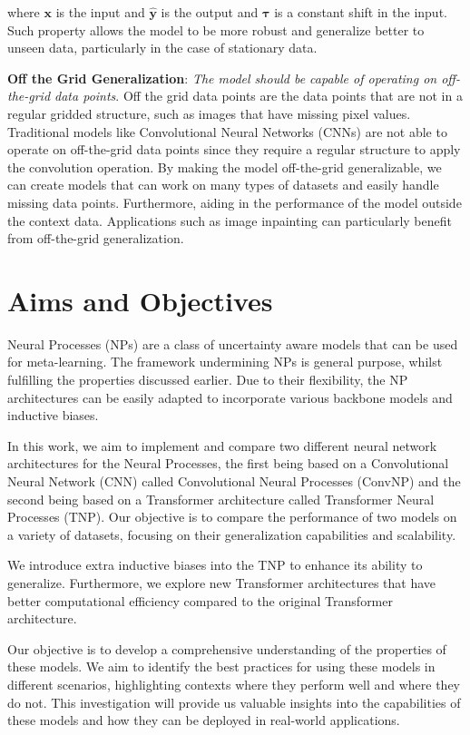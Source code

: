 \documentclass[../../main.tex]{subfiles}
\begin{document}
where $\bm{x}$ is the input and $\bm{\hat{y}}$ is the output and $\bm{\tau}$ is a constant shift in the input. Such property allows the model to be more robust and generalize better to unseen data, particularly in the case of stationary data.


\textbf{Off the Grid Generalization}: \emph{The model should be capable of operating on off-the-grid data points}. Off the grid data points are the data points that are not in a regular gridded structure, such as images that have missing pixel values. Traditional models like Convolutional Neural Networks (CNNs) are not able to operate on off-the-grid data points since they require a regular structure to apply the convolution operation. By making the model off-the-grid generalizable, we can create models that can work on many types of datasets and easily handle missing data points. Furthermore, aiding in the performance of the model outside the context data. Applications such as image inpainting can particularly benefit from off-the-grid generalization.


\section{Aims and Objectives}

Neural Processes (NPs) \parencite{garnelo2018neural} are a class of uncertainty aware models that can be used for meta-learning. The framework undermining NPs is general purpose, whilst fulfilling the properties discussed earlier. Due to their flexibility, the NP architectures can be easily adapted to incorporate various backbone models and inductive biases. 

In this work, we aim to implement and compare two different neural network architectures for the Neural Processes, the first being based on a Convolutional Neural Network (CNN) called Convolutional Neural Processes (ConvNP) and the second being based on a Transformer architecture called Transformer Neural Processes (TNP). Our objective is to compare the performance of two models on a variety of datasets, focusing on their generalization capabilities and scalability.

We introduce extra inductive biases into the TNP to enhance its ability to generalize. Furthermore, we explore new Transformer architectures that have better computational efficiency compared to the original Transformer architecture.

Our objective is to develop a comprehensive understanding of the properties of these models. We aim to identify  the best practices for using these models in different scenarios, highlighting contexts where they perform well and where they do not. This investigation will provide us valuable insights into the capabilities of these models and how they can be deployed in real-world applications.





\ifSubfilesClassLoaded{%
    \printbibliography{}
}{} 
\end{document}
